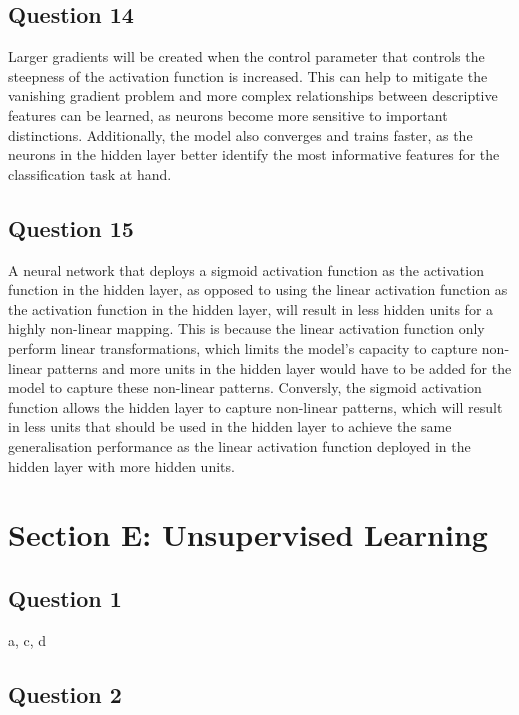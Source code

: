 \documentclass[10pt]{article}
\begin{document}
\subsection*{Question 14}

Larger gradients will be created when the control parameter that controls the steepness of the activation function is increased.
This can help to mitigate the vanishing gradient problem and more complex relationships between descriptive features can be learned,
as neurons become more sensitive to important distinctions.
Additionally, the model also converges and trains faster, as the neurons in the hidden layer better identify the most informative features
for the classification task at hand.

\subsection*{Question 15}

A neural network that deploys a sigmoid activation function as the activation function in the hidden layer, as
opposed to using the linear activation function as the activation function in the hidden layer, will
result in less hidden units for a highly non-linear mapping. This is because the linear activation
function only perform linear transformations, which limits the model's capacity to capture non-linear
patterns and more units in the hidden layer would have to be added for the model to capture these non-linear patterns.
Conversly, the sigmoid activation function allows the hidden layer to capture non-linear patterns, which
will result in less units that should be used in the hidden layer to achieve the same generalisation
performance as the linear activation function deployed in the hidden layer with more hidden units.  

\section*{Section E: Unsupervised Learning}

\subsection*{Question 1}

a, c, d

\subsection*{Question 2}
\end{document}
